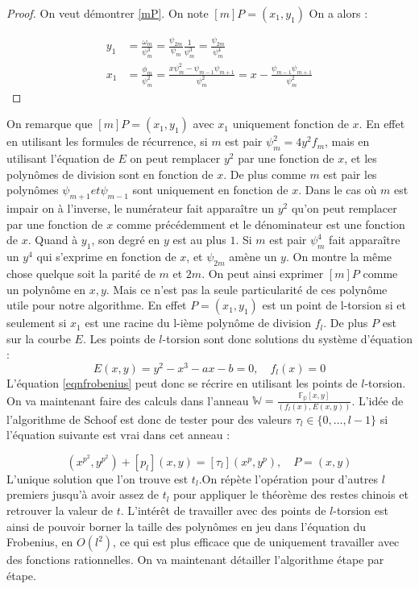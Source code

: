 \documentclass{article}
\begin{document}
\begin{proof}
On veut démontrer \ref{mP}. 
\newline
On note $[m]P = (x_1, y_1)$ 
On a alors : 

\begin{align*}
y_1 &= \frac{\omega_m}{\psi^3_m} = \frac{\psi_{2m}}{\psi_m} \frac{1}{\psi_m^3} = \frac{\psi_{2m}}{\psi_m^4} \\
x_1 &= \frac{\phi_m}{\psi^2_m} =  \frac{x \psi^2_m - \psi_{m-1}\psi_{m+1}}{\psi_m^2} = x - \frac{\psi_{m-1}\psi_{m+1}}{\psi_m^2}	
\end{align*}




\end{proof}
On remarque que $[m]P = (x_1, y_1)$ avec $x_1$ uniquement fonction de $x$. En effet en utilisant les formules de récurrence, si $m$ est pair $\psi_m^2 = 4y^2f_m$, mais en utilisant l'équation de $E$ on peut remplacer $y^2$ par une fonction de $x$, et les polynômes de division sont en fonction de $x$. De plus comme $m$ est pair les polynômes $\psi_{m+1} et \psi_{m-1}$ sont uniquement en fonction de $x$. Dans le cas où $m$ est impair on à l'inverse, le numérateur fait apparaître un $y^2$ qu'on peut remplacer par une fonction de $x$ comme précédemment et le dénominateur est une fonction de $x$. Quand à $y_1$, son degré en $y$ est au plus $1$. Si $m$ est pair $\psi_m^4$ fait apparaître un $y^4$ qui s'exprime en fonction de $x$, et $\psi_{2m}$ amène un $y$. On montre la même chose quelque soit la parité de $m$ et $2m$.
On peut ainsi exprimer $[m]P$ comme un polynôme en $x,y$. Mais ce n'est pas la seule particularité de ces polynôme utile pour notre algorithme. En effet $P = (x_1, y_1)$ est un point de l-torsion si et seulement si $x_1$ est une racine du l-ième polynôme de division $f_l$. De plus $P$ est sur la courbe $E$. Les points de $l$-torsion sont donc solutions du système d'équation : 
\begin{equation}
E(x,y) = y^2 - x^3 - ax - b = 0, \quad f_l(x) = 0
\end{equation}
L'équation \ref{eqnfrobenius} peut donc se récrire en utilisant les points de $l$-torsion. On va maintenant faire des calculs dans l'anneau $\mathbb{W}= \frac{\mathbb{F_p}[x,y]}{(f_l(x), E(x,y))}$. L'idée de l'algorithme de Schoof est donc de tester pour des valeurs $\tau_l \in \lbrace 0, \ldots, l-1 \rbrace$ si l'équation suivante est vrai dans cet anneau :

\begin{equation}
(x^{p^2}, y^{p^2}) + [p_l](x,y) = [\tau_l](x^{p}, y^{p}),  \quad P=(x,y)
\end{equation}
L'unique solution que l'on trouve est $t_l$.On répète l'opération pour d'autres $l$ premiers jusqu'à avoir assez de $t_l$ pour appliquer le théorème des restes chinois et retrouver la valeur de $t$. L'intérêt de travailler avec des points de $l$-torsion est ainsi de pouvoir borner la taille des polynômes en jeu dans l'équation du Frobenius, en $O(l^2)$, ce qui est plus efficace que de uniquement travailler avec des fonctions rationnelles.
\newline
\medskip
On va maintenant détailler l'algorithme étape par étape. 
\end{document}
